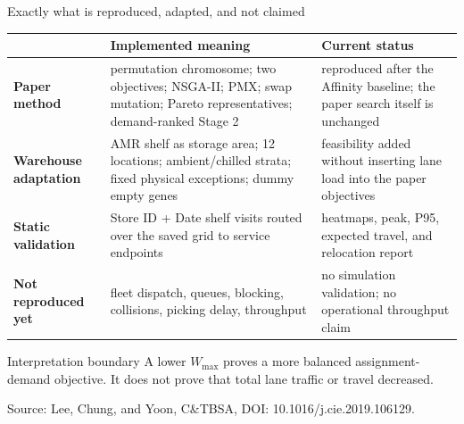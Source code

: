 \documentclass[aspectratio=169,10pt]{beamer}
\newcommand{\source}[1]{\vfill{\tiny\color{gray}Source: #1}}
\begin{document}
\begin{frame}{Exactly what is reproduced, adapted, and not claimed}
  \scriptsize
  \begin{tabular}{@{}p{}p{}p{}@{}}
    \toprule
    & \textbf{Implemented meaning} & \textbf{Current status}\\
    \midrule
    \cellcolor{Green!12}\textbf{Paper method}
      & permutation chromosome; two objectives; NSGA-II; PMX; swap mutation;
        Pareto representatives; demand-ranked Stage 2
      & reproduced after the Affinity baseline; the paper search itself is unchanged\\[1mm]
    \cellcolor{Blue!10}\textbf{Warehouse adaptation}
      & AMR shelf as storage area; 12 locations; ambient/chilled strata;
        fixed physical exceptions; dummy empty genes
      & feasibility added without inserting lane load into the paper objectives\\[1mm]
    \cellcolor{Orange!12}\textbf{Static validation}
      & Store ID + Date shelf visits routed over the saved grid to service endpoints
      & heatmaps, peak, P95, expected travel, and relocation report\\[1mm]
    \cellcolor{Red!10}\textbf{Not reproduced yet}
      & fleet dispatch, queues, blocking, collisions, picking delay, throughput
      & no simulation validation; no operational throughput claim\\
    \bottomrule
  \end{tabular}
  \vspace{0.35cm}
  \begin{alertblock}{Interpretation boundary}
    A lower $W_{\max}$ proves a more balanced assignment-demand objective.
    It does not prove that total lane traffic or travel decreased.
  \end{alertblock}
  \source{Lee, Chung, and Yoon, C\&TBSA, DOI: 10.1016/j.cie.2019.106129.}
\end{frame}
\end{document}
